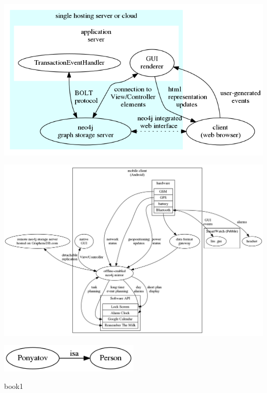\noindent\includegraphics[width=\textwidth]{fig/architecture.png}

\noindent\includegraphics[width=\textwidth]{fig/mobile.png}

\noindent\includegraphics[width=0.5\textwidth]{fig/person.png}

\begin{thebibliography}{99}
 book1
\end{thebibliography}



